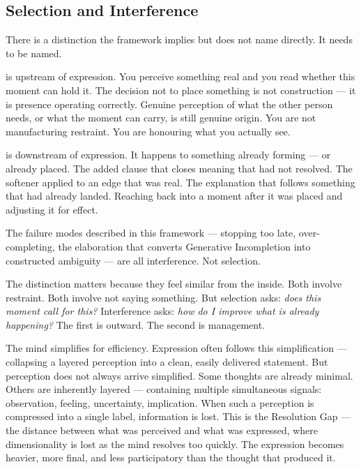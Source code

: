 
\subsection{Selection and Interference}

There is a distinction the framework implies but does not name directly.
It needs to be named.

 is upstream of expression. You perceive something real 
and you read whether this moment can hold it. The decision not to place 
something is not construction --- it is presence operating correctly. 
Genuine perception of what the other person needs, or what the moment 
can carry, is still genuine origin. You are not manufacturing restraint. 
You are honouring what you actually see.

 is downstream of expression. It happens to something 
already forming --- or already placed. The added clause that closes meaning 
that had not resolved. The softener applied to an edge that was real. 
The explanation that follows something that had already landed. 
Reaching back into a moment after it was placed and adjusting it for effect.

The failure modes described in this framework --- stopping too late, 
over-completing, the elaboration that converts Generative Incompletion 
into constructed ambiguity --- are all interference. Not selection.

The distinction matters because they feel similar from the inside. 
Both involve restraint. Both involve not saying something. But selection 
asks: \textit{does this moment call for this?} Interference asks: 
\textit{how do I improve what is already happening?} The first is 
outward. The second is management.

The mind simplifies for efficiency. Expression often follows this simplification --- collapsing a layered 
perception into a clean, easily delivered statement.
But perception does not always arrive simplified.
Some thoughts are already minimal. Others are inherently layered --- containing multiple 
simultaneous signals: observation, feeling, uncertainty, implication. When such a 
perception is compressed into a single label, information is lost. 
This is the Resolution Gap --- the distance between what was perceived and 
what was expressed, where dimensionality is lost as the mind resolves too quickly. 
The expression becomes heavier, more final, and less participatory than the thought that produced it.

